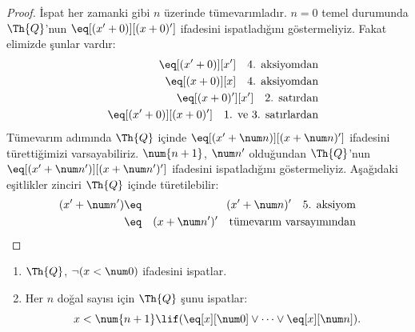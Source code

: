 \begin{proof}
İspat her zamanki gibi $n$ üzerinde tümevarımladır. $n=0$ temel durumunda
$\Th{Q}$'nun $\eq[(x'+0)][(x+0)']$ ifadesini ispatladığını göstermeliyiz.
Fakat elimizde şunlar vardır:
\begin{eqnarray*}
& & \eq[(x' + 0)][x'] \quad \text{4. aksiyomdan} \\
& & \eq[(x + 0)][x] \quad \text{4. aksiyomdan} \\
& & \eq[(x+0)'][x'] \quad \text{2. satırdan} \\
& & \eq[(x' + 0)][(x + 0)'] \quad \text{1. ve 3. satırlardan}
\end{eqnarray*}
Tümevarım adımında $\Th{Q}$ içinde
$\eq[(x' + \num n)][(x + \num n)']$ ifadesini türettiğimizi
varsayabiliriz. $\num{n+1}$, $\num n'$ olduğundan $\Th{Q}$'nun
$\eq[(x' + \num n')][(x + \num n')']$ ifadesini ispatladığını göstermeliyiz.
Aşağıdaki eşitlikler zinciri $\Th{Q}$ içinde türetilebilir:
\begin{eqnarray*}
(x' + \num n') & \eq & (x' + \num n)' \quad \text{5. aksiyom} \\
& \eq & (x + \num n')' \quad \text{tümevarım varsayımından}
\end{eqnarray*}
\end{proof}

\begin{lem}
\begin{enumerate}
\item $\Th{Q}$, $\lnot (x < \num 0)$ ifadesini ispatlar.
\item Her $n$ doğal sayısı için $\Th{Q}$ şunu ispatlar:
\[
x < \num {n+1} \lif (\eq[x][\num 0] \lor \dots \lor \eq[x][\num n]).
\]
\end{enumerate}
\end{lem}


